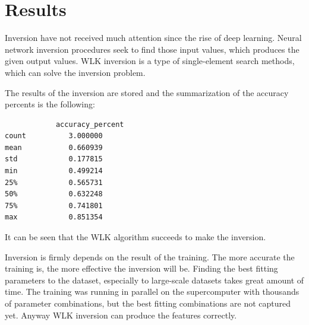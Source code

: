 \section{Results}

Inversion have not received much attention since the rise of deep learning. Neural network inversion procedures seek to find those input values, which produces the given output values. WLK inversion is a type of single-element search methods, which can solve the inversion problem.\medskip

The results of the inversion are stored and the summarization of the accuracy percents is the following:
\begin{lstlisting}
       		accuracy_percent
count          3.000000
mean           0.660939
std            0.177815
min            0.499214
25%            0.565731
50%            0.632248
75%            0.741801
max            0.851354
\end{lstlisting}
It can be seen that the WLK algorithm succeeds to make the inversion. \bigskip

Inversion is firmly depends on the result of the training. The more accurate the training is, the more effective the inversion will be. Finding the best fitting parameters to the dataset, especially to large-scale datasets takes great amount of time. The training was running in parallel on the supercomputer with thousands of parameter combinations, but the best fitting combinations are not captured yet. Anyway WLK inversion can produce the features correctly. 

